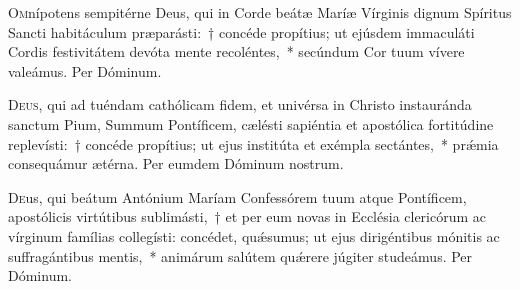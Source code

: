 \documentclass[vesperale_romanum.tex]{subfiles}
\begin{document}
\oratio
\lettrine{O}{m}nípotens sempitérne Deus, qui in Corde beátæ Maríæ Vírginis dignum Spíritus Sancti habitáculum præparásti:~† concéde propítius; ut ejúsdem immaculáti Cordis festivitátem devóta mente recoléntes,~* secúndum Cor tuum vívere valeámus. Per Dóminum.






\duplexmtv

\oratio
\lettrine{D}{eus}, qui ad tuéndam cathólicam fidem, et univérsa in Christo instauránda sanctum Pium, Summum Pontíficem, cælésti sapiéntia et apostólica fortitúdine replevísti:~† concéde propítius; ut ejus institúta et exémpla se\-ctántes,~* prǽmia consequámur ætérna.
Per eumdem Dóminum nostrum.

 

 
\oratio
\lettrine{D}{e}us,  qui beátum Antónium Maríam Confessórem tuum atque Pontíficem, apostólicis virtútibus sublimásti,~† et per eum novas in Ecclésia clericórum ac vírginum famílias collegísti: concédet, quǽsumus; ut ejus dirigéntibus mónitis ac suffragántibus mentis,~* animárum salútem quǽrere júgiter studeámus.
Per Dóminum.
\end{document}
